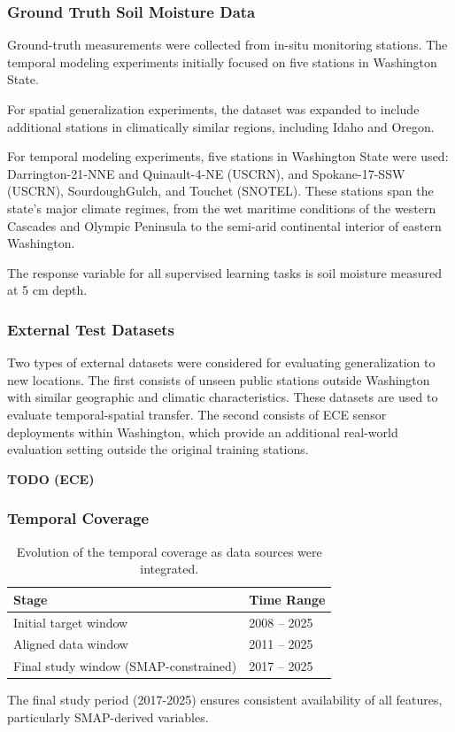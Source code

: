 \subsubsection*{Ground Truth Soil Moisture Data}
Ground-truth measurements were collected from in-situ monitoring stations. The temporal modeling experiments initially focused on five stations in Washington State.

For spatial generalization experiments, the dataset was expanded to include additional stations in climatically similar regions, including Idaho and Oregon.



For temporal modeling experiments, five stations in Washington State were used: Darrington-21-NNE and Quinault-4-NE (USCRN), and Spokane-17-SSW (USCRN), SourdoughGulch, and Touchet (SNOTEL). These stations span the state's major climate regimes, from the wet maritime conditions of the western Cascades and Olympic Peninsula to the semi-arid continental interior of eastern Washington.

The response variable for all supervised learning tasks is soil moisture measured at 5 cm depth.

\subsubsection*{External Test Datasets}

Two types of external datasets were considered for evaluating generalization to new locations.
The first consists of unseen public stations outside Washington with similar geographic and climatic characteristics. These datasets are used to evaluate temporal-spatial transfer.
The second consists of ECE sensor deployments within Washington, which provide an additional real-world evaluation setting outside the original training stations.

\textbf{TODO (ECE)}

\subsubsection*{Temporal Coverage}

\begin{table}[H]
\centering
\begin{tabular}{ll}
\toprule
\textbf{Stage} & \textbf{Time Range} \\
\midrule
Initial target window & 2008 -- 2025 \\
Aligned data window & 2011 -- 2025 \\
Final study window (SMAP-constrained) & 2017 -- 2025 \\
\bottomrule
\end{tabular}
\caption{Evolution of the temporal coverage as data sources were integrated.}
\end{table}

The final study period (2017-2025) ensures consistent availability of all features, particularly SMAP-derived variables.
